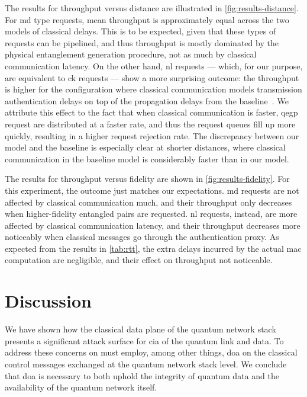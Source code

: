 The results for throughput versus distance are illustrated in \cref{fig:results-distance}. For
\acrfull{md} type requests, mean throughput is approximately equal across the two models of
classical delays. This is to be expected, given that these types of requests can be pipelined, and
thus throughput is mostly dominated by the physical entanglement generation procedure, not as much
by classical communication latency. On the other hand, \acrfull{nl} requests --- which, for our
purpose, are equivalent to \acrfull{ck} requests --- show a more surprising outcome: the throughput
is higher for the configuration where classical communication models transmission authentication
delays on top of the propagation delays from the baseline~\cite{dahlberg_2019_egp}. We attribute
this effect to the fact that when classical communication is faster, \acrshort{qegp} request are
distributed at a faster rate, and thus the request queues fill up more quickly, resulting in a
higher request rejection rate. The discrepancy between our model and the baseline is especially
clear at shorter distances, where classical communication in the baseline model is considerably
faster than in our model.

The results for throughput versus fidelity are shown in \cref{fig:results-fidelity}. For this
experiment, the outcome just matches our expectations. \acrshort{md} requests are not affected by
classical communication much, and their throughput only decreases when higher-fidelity entangled
pairs are requested. \acrshort{nl} requests, instead, are more affected by classical communication
latency, and their throughput decreases more noticeably when classical messages go through the
authentication proxy. As expected from the results in \cref{tab:rtt}, the extra delays incurred by
the actual \acrshort{mac} computation are negligible, and their effect on throughput not noticeable.

\section{Discussion}

We have shown how the classical data plane of the quantum network stack presents a significant
attack surface for \acrlong{cia} of the quantum link and data. To address these concerns on must
employ, among other things, \acrlong{doa} on the classical control messages exchanged at the quantum
network stack level. We conclude that \acrlong{doa} is necessary to both uphold the integrity of
quantum data and the availability of the quantum network itself.

